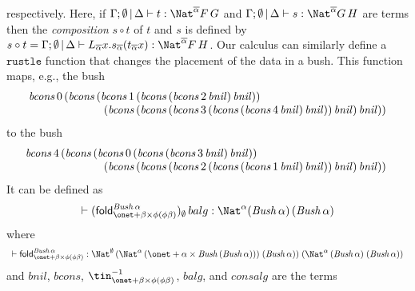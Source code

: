 \documentclass{lmcs}
\theoremstyle{plain}\newtheorem{satz}[thm]{Satz}
\newcommand{\fold}{\mathsf{fold}}
\begin{document}
respectively. Here, if $\Gamma; \emptyset \,|\, \Delta \vdash t:
\Nat^{\overline{\alpha}} F\,G$ and $\Gamma; \emptyset \,|\, \Delta
\vdash s: \Nat^{\overline{\alpha}} G\,H$ are terms then the {\em
  composition} $s \circ t$ of $t$ and $s$ is defined by $s \circ t =
\Gamma; \emptyset\,|\, \Delta \vdash L_{\overline{\alpha}}
x. s_{\overline{\alpha}}(t_{\overline{\alpha}}x):
\Nat^{\overline{\alpha}} F\,H$. Our calculus can similarly define a
$\mathtt{rustle}$ function that changes the placement of the data in a
bush. This function maps, e.g., the bush
\[\begin{array}{l}
\mathit{bcons}\,0 \,(\mathit{bcons}\, (\mathit{bcons}\, 1\,
(\mathit{bcons}\, (\mathit{bcons}\, 2\,\mathit{bnil}) \,
\mathit{bnil}))\\ \hspace*{0.93in}(\mathit{bcons}\, (\mathit{bcons}\,
(\mathit{bcons}\, 3 \, (\mathit{bcons}\, (\mathit{bcons}\, 4\,
\mathit{bnil})\,  \mathit{bnil}))\, \mathit{bnil})\, \mathit{bnil}))
\end{array}\]
to the bush
\[\begin{array}{c}
\hspace*{-1.64in}\mathit{bcons}\,4\, (\mathit{bcons}\, (\mathit{bcons}\, 0
\,(\mathit{bcons}\, (\mathit{bcons}\, 3 \, \mathit{bnil}) \,
\mathit{bnil}))\\ 
\hspace*{0.93in}(\mathit{bcons}\, (\mathit{bcons}\, (\mathit{bcons}\, 2
\,(\mathit{bcons}\, (\mathit{bcons}\, 1 \, \mathit{bnil}) \,
\mathit{bnil})) \, \mathit{bnil})\, \mathit{bnil})) 
\end{array}\]
It can be defined as
\[\vdash (\fold^{\mathit{Bush}\,\alpha}_{\onet + \beta \times \phi (\phi \beta)})_\emptyset\, balg
: \Nat^\alpha (\mathit{Bush}\,\alpha)\,(\mathit{Bush}\,\alpha)\]
where
\[\begin{array}{lll}
\vdash \fold_{\onet + \beta \times \phi
  (\phi\beta)}^{\mathit{Bush}\,\alpha} : \Nat^{\emptyset}\, (\Nat^{\alpha}\, 
(\onet + \alpha \times \mathit{Bush}\, (\mathit{Bush}\, \alpha))) \;
(\mathit{Bush}\,\alpha))\; (\Nat^{\alpha} \,(\mathit{Bush}\,\alpha) \;
(\mathit{Bush}\,\alpha))\\
\end{array}\]
and $\mathit{bnil}$, $\mathit{bcons}$, $\tin^{-1}_{\onet + \beta
  \times \phi (\phi\beta)}$, $\mathit{balg}$, and $\mathit{consalg}$
are the terms
\end{document}
